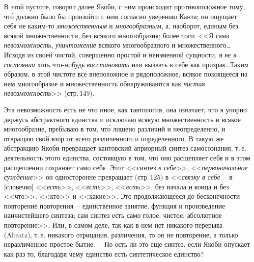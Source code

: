 В этой пустоте, говорит далее Якоби, с ним происходит
противоположное тому, чт\'о должно было бы произойти
с ним согласно уверению Канта; он ощущает себя не
каким-то \emph{множественным} и \emph{многообразным}, а, наоборот,
единым без всякой множественности, без всякого многообразия;
более того: <<Я сама \emph{невозможность}, \emph{уничтожение}
всякого многообразного и множественного\dots Исходя из
своей чистой, совершенно простой и неизменной сущности,
я \emph{не в состоянии} хоть что-нибудь \emph{восстановить} или
вызвать в себе как призрак\dots Таким образом, в этой чистоте
все внеположное и рядоположное, всякое покоящееся
на нем многообразие и множественность обнаруживаются
как \emph{чистая невозможность}>> (стр.\,149).

Эта невозможность есть не что иное, как тавтология,
она означает, что я упорно держусь абстрактного единства
и исключаю всякую множественность и всякое многообразие,
пребываю в том, чт\'о лишено различий и неопределенно,
и отвращаю свой взор от всего различенного
и определенного. В такую же абстракцию Якоби превращает
кантовский априорный синтез самосознания, т.\,е. деятельность
этого единства, состоящую в том, что оно расщепляет
себя и в этом расщеплении сохраняет само себя.
Этот <<синтез \emph{в себе}>>, <<\emph{первоначальное суждение}>> он односторонне
превращает (стр.\,125) в <<\emph{связку в себе}~-- в
[словечко] <<\emph{есть}>>, <<\emph{есть}>>, <<\emph{есть}>>, без начала и конца и
без <<что>>, <<кто>> и <<какие>>. Это продолжающееся до бесконечности
повторение повторения~-- единственное занятие,
функция и произведение наичистейшего синтеза; сам
синтез есть само голое, чистое, абсолютное повторение>>.
Или, в самом деле, так как в нем нет никакого перерыва
(Absatz), т.\,е. никакого отрицания, различения, то он не
повторение, а только неразличенное простое бытие.~-- Но
есть ли это еще синтез, если Якоби опускает как раз то,
благодаря чему единство есть синтетическое единство?


